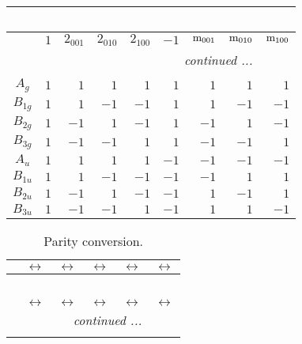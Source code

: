 \documentclass[fleqn,10pt,landscape]{article}
\begin{document}
\begin{itemize}
\begin{center}
\begin{longtable}{c|rrrrrrrr}
\multicolumn{8}{l}{\tablename\ \thetable{}} \\
 \hline \hline
 & $ 1 $ & $ 2{}_{001} $ & $ 2{}_{010} $ & $ 2{}_{100} $ & $ -1 $ & $ {\rm m}_{001} $ & $ {\rm m}_{010} $ & $ {\rm m}_{100} $ \\ \hline \endhead

 \hline \hline
\multicolumn{8}{r}{\footnotesize\it continued ...} \\ \endfoot

 \hline \hline
\multicolumn{8}{r}{} \\ \endlastfoot

$ A_{g} $ & $ 1 $ & $ 1 $ & $ 1 $ & $ 1 $ & $ 1 $ & $ 1 $ & $ 1 $ & $ 1 $ \\
$ B_{1g} $ & $ 1 $ & $ 1 $ & $ -1 $ & $ -1 $ & $ 1 $ & $ 1 $ & $ -1 $ & $ -1 $ \\
$ B_{2g} $ & $ 1 $ & $ -1 $ & $ 1 $ & $ -1 $ & $ 1 $ & $ -1 $ & $ 1 $ & $ -1 $ \\
$ B_{3g} $ & $ 1 $ & $ -1 $ & $ -1 $ & $ 1 $ & $ 1 $ & $ -1 $ & $ -1 $ & $ 1 $ \\
$ A_{u} $ & $ 1 $ & $ 1 $ & $ 1 $ & $ 1 $ & $ -1 $ & $ -1 $ & $ -1 $ & $ -1 $ \\
$ B_{1u} $ & $ 1 $ & $ 1 $ & $ -1 $ & $ -1 $ & $ -1 $ & $ -1 $ & $ 1 $ & $ 1 $ \\
$ B_{2u} $ & $ 1 $ & $ -1 $ & $ 1 $ & $ -1 $ & $ -1 $ & $ 1 $ & $ -1 $ & $ 1 $ \\
$ B_{3u} $ & $ 1 $ & $ -1 $ & $ -1 $ & $ 1 $ & $ -1 $ & $ 1 $ & $ 1 $ & $ -1 $ \\
\end{longtable}
\end{center}
\begin{center}
\renewcommand{\arraystretch}{1.0}
\begin{longtable}{cccccc}
\caption{Parity conversion.}
 \\
 \hline \hline
 & $\leftrightarrow$ & $\leftrightarrow$ & $\leftrightarrow$ & $\leftrightarrow$ & $\leftrightarrow$ \\ \hline \endfirsthead

\multicolumn{5}{l}{\tablename\ \thetable{}} \\
 \hline \hline
 & $\leftrightarrow$ & $\leftrightarrow$ & $\leftrightarrow$ & $\leftrightarrow$ & $\leftrightarrow$ \\ \hline \endhead

 \hline \hline
\multicolumn{5}{r}{\footnotesize\it continued ...} \\ \endfoot


\end{longtable}
\end{center}
\end{itemize}
\end{document}

